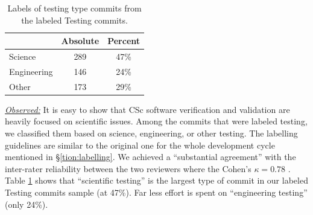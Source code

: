 \documentclass[conference,10pt]{IEEEtran}
\begin{document}
\begin{table}
\vspace{-15pt}
\caption{Labels of testing type commits from the labeled Testing commits.}\label{tbl:testing}
\footnotesize \begin{tabular}{l|c|c}
\multicolumn{1}{c|}{} & \multicolumn{1}{c|}{Absolute} & \multicolumn{1}{c}{Percent}\\
\hline
Science & 289 & 47\% \\
Engineering & 146 & 24\% \\
Other & 173 & 29\% 
\end{tabular}
\end{table}\noindent \textit{\underline{Observed:}}
It is easy to show that CSc software verification and validation are heavily focused on scientific issues. Among the commits that were labeled testing, we classified them based on science, engineering, or other testing. The labelling guidelines are similar to the original one for the whole development cycle mentioned in \S\ref{tion:labelling}. We achieved a ``substantial agreement'' with the inter-rater reliability between the two reviewers where the Cohen's $\kappa = 0.78$ \cite{irr_kappa}.
Table \ref{tbl:testing} shows that ``scientific testing'' is the largest type of commit in our labeled Testing commits sample (at 47\%). 
Far less effort is spent on ``engineering testing'' (only 24\%). 
\end{document}
